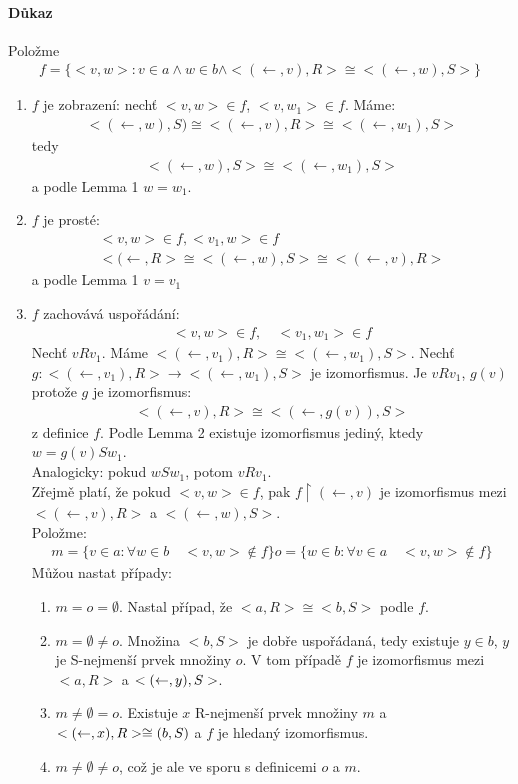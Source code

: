 \documentclass[a4paper,12pt,titlepage]{article}
\begin{document}
\paragraph{Důkaz}
Položme 
\begin{align}
f = \{ <v,w> : v \in a \land w \in b \land <(\leftarrow,v), R> \cong <(\leftarrow, w), S>\}
\end{align}
\begin{enumerate}
\item
$f$ je zobrazení: nechť $<v,w> \in f$, $<v,w_1> \in f$.
Máme:
\begin{align}
	<(\leftarrow, w), S) \cong <(\leftarrow, v), R> \cong <(\leftarrow, w_1), S>
\end{align}
tedy 
\begin{align}
	<(\leftarrow, w), S> \cong <(\leftarrow, w_1), S>
\end{align}
a podle Lemma 1 $w = w_1$.
\item
$f$ je prosté:
\begin{align}
	<v,w> \in f, <v_1,w> \in f \\
	<(\leftarrow, R> \cong <(\leftarrow, w),S> \cong <(\leftarrow, v), R>
\end{align}
a podle Lemma 1 $v = v_1$
\item
$f$ zachovává uspořádání:
\begin{align}
	<v,w> \in f, \quad <v_1, w_1> \in f
\end{align}
Nechť $v R v_1$. Máme $<(\leftarrow, v_1), R> \cong <(\leftarrow, w_1), S>$.
Nechť $g: <(\leftarrow, v_1), R> \to <(\leftarrow, w_1),S>$ je izomorfismus. 
Je $v R v_1$, $g(v)$ protože $g$ je izomorfismus:
\begin{align}
	<(\leftarrow,v), R> \cong <(\leftarrow, g(v)), S>
\end{align}
z definice $f$. Podle Lemma 2 existuje izomorfismus jediný, ktedy $w = g(v) S
w_1$. \\
Analogicky: pokud $w S w_1$, potom $v R v_1$. \\
Zřejmě platí, že pokud $<v,w> \in f$, pak $f \upharpoonright (\leftarrow, v)$ je izomorfismus
mezi $<(\leftarrow,v), R>$ a $<(\leftarrow,w), S>$.\\
Položme: 
\begin{align}
	m = \{ v \in a : \forall w \in b \quad <v,w> \nin f \}
	o = \{ w \in b : \forall v \in a \quad <v,w> \nin f \}
\end{align}
Můžou nastat případy:
\begin{enumerate}
	\item $m = o = \emptyset$.  Nastal případ, že $<a, R> \cong <b,S>$ podle $f$.
	\item $m = \emptyset \neq o$. Množina $<b,S>$ je dobře uspořádaná, tedy
	existuje $y \in b$, $y$ je S-nejmenší prvek množiny $o$. V tom případě $f$ je
	izomorfismus mezi $<a,R>$ a $<(\leftarrow, y), S>$.
	\item $m \neq \emptyset = o$. Existuje $x$ R-nejmenší prvek množiny $m$ a
	$<(\leftarrow, x), R> \cong (b,S)$ a $f$ je hledaný izomorfismus.
	\item $m \neq \emptyset \neq o$, což je ale ve sporu s definicemi $o$ a $m$.
\end{enumerate}
\end{enumerate}
\end{document}

